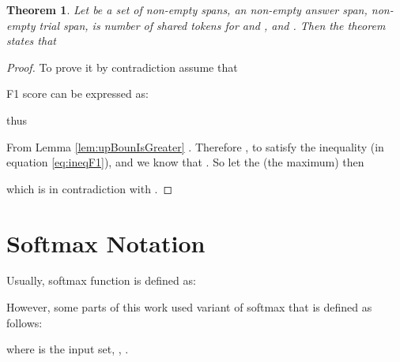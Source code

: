 \documentclass[11pt,a4paper]{article}
\newtheorem{theorem}{Theorem}[section]
\begin{document}
\begin{theorem}
\label{the:F1worthSearchingTheorem}
Let  be a set of non-empty spans,  an non-empty answer span,  non-empty trial span,  is number of shared tokens for  and , and . Then the theorem states that 


\end{theorem}
\begin{proof}
To prove it by contradiction assume that



F1 score can be expressed as:


thus 


From Lemma \ref{lem:upBounIsGreater} . Therefore , to satisfy the inequality (in equation \ref{eq:ineqF1}), and we know that . So let the  (the maximum) then


which is in contradiction with .
\end{proof}

\section{Softmax Notation}
\label{app:softmax_not}
Usually, softmax function  is  defined as:



However, some parts of this work used variant of softmax that is defined as follows:

where  is the input set, , .
\end{document}
